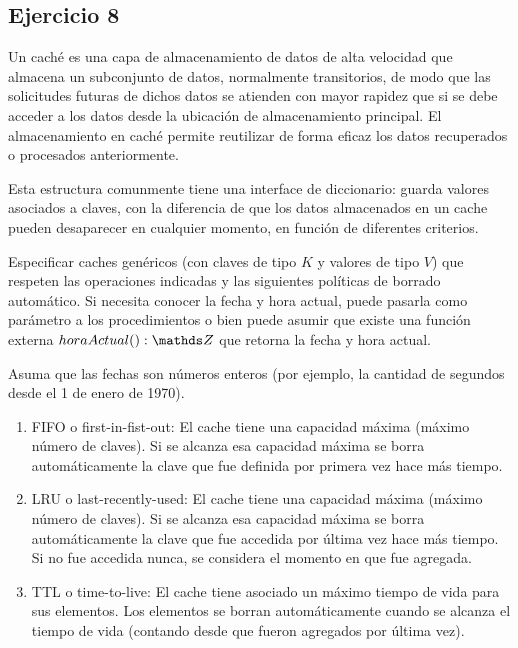 \subsection{Ejercicio 8}
Un caché es una capa de almacenamiento de datos de alta velocidad que almacena un subconjunto de datos, normalmente transitorios, de modo que las solicitudes futuras de dichos datos se atienden con mayor rapidez que si se debe acceder a los datos desde la ubicación de almacenamiento principal. El almacenamiento en caché permite reutilizar de forma eficaz los datos recuperados o procesados anteriormente.

Esta estructura comunmente tiene una interface de diccionario: guarda valores asociados a claves, con la diferencia de que los datos almacenados en un cache pueden desaparecer en cualquier momento, en función de diferentes criterios.

Especificar caches genéricos (con claves de tipo $K$ y valores de tipo $V$) que respeten las operaciones indicadas y las siguientes políticas de borrado automático. Si necesita conocer la fecha y hora actual, puede pasarla como parámetro a los procedimientos o bien puede asumir que existe una función externa $horaActual(): \ent$ que retorna la fecha y hora actual.

Asuma que las fechas son números enteros (por ejemplo, la cantidad de segundos desde el 1 de enero de 1970).

\begin{enumerate}[label=\alph*)]
	\item FIFO o first-in-fist-out:
	      El cache tiene una capacidad máxima (máximo número de claves). Si se alcanza esa capacidad máxima se borra automáticamente la clave que fue deﬁnida por primera vez hace más tiempo.

	\item LRU o last-recently-used:
	      El cache tiene una capacidad máxima (máximo número de claves). Si se alcanza esa capacidad máxima se borra automáticamente la clave que fue accedida por última vez hace más tiempo. Si no fue accedida nunca, se considera el momento en que fue agregada.

	\item TTL o time-to-live:
	      El cache tiene asociado un máximo tiempo de vida para sus elementos. Los elementos se borran automáticamente cuando se alcanza el tiempo de vida (contando desde que fueron agregados por última vez).
\end{enumerate}

